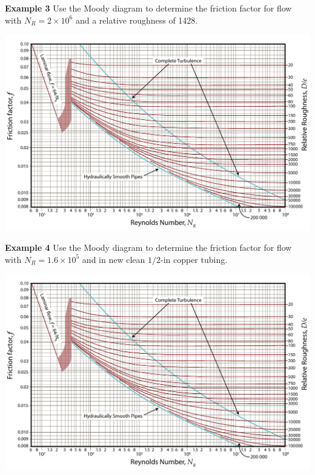 \documentclass[10pt]{amsart}
\begin{document}
	\raggedright
	\textbf{Example 3}	
	Use the Moody diagram to determine the friction factor for flow with $N_R=2\times 10^6$ and a relative roughness of
	1428.\par\bigskip
	\begin{center}
		\includegraphics[scale=1.1, angle=90]{../../figs/05FrictionLosses/moody.pdf}
	\end{center}
	
	
	\newpage
	
	
	\textbf{Example 4}	
	Use the Moody diagram to determine the friction factor for flow with $N_R=1.6\times 10^5$ and in new clean
	$1/2$-in copper tubing.\par\medskip
	
	\begin{center}
		\includegraphics[scale=1.1, angle=90]{../../figs/05FrictionLosses/moody.pdf}
	\end{center}
	
\end{document}
